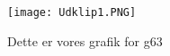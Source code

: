 \begin{figure}[h]
	\centering
	\texttt{[image: Udklip1.PNG]}
	\caption{Dette er vores grafik for g63}
\end{figure}